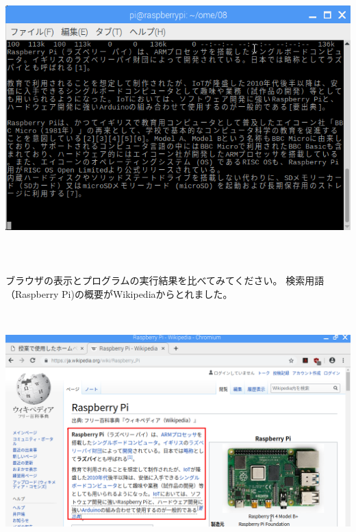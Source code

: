 \documentclass[a4paper,12pt,dvipdfmx]{jarticle}
\begin{document}
\begin{center}
\includegraphics[width=17.006cm,height=11.077cm]{textbook-img061.png}

\end{center}
ブラウザの表示とプログラムの実行結果を比べてみてください。
検索用語（Raspberry
Pi)の概要がWikipediaからとれました。



\begin{center}
\includegraphics[width=17.006cm,height=9.28cm]{textbook-img059.png}

\end{center}
\end{document}
